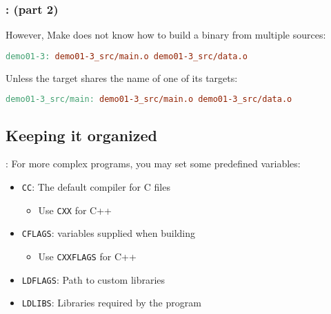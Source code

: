 \begin{frame}[fragile]
    \frametitle{\secname: \small\subsecname (part 2)\normalsize}

    However, Make does not know how to build a binary from multiple sources:

    \begin{lstlisting}[language=make]
demo01-3: demo01-3_src/main.o demo01-3_src/data.o
    \end{lstlisting}

    Unless the target shares the name of one of its targets:
    \begin{lstlisting}[language=make]
demo01-3_src/main: demo01-3_src/main.o demo01-3_src/data.o
    \end{lstlisting}
\end{frame}

%
%
%

\subsection{Keeping it organized}
\begin{frame}{\secname: \small\subsecname\normalsize}
    For more complex programs, you may set some predefined
    variables:

    \begin{itemize}
        \item \texttt{CC}: The default compiler for C files
        \begin{itemize}
            \item Use \texttt{CXX} for C++
        \end{itemize}
        \item \texttt{CFLAGS}: variables supplied when building
        \begin{itemize}
            \item Use \texttt{CXXFLAGS} for C++
        \end{itemize}
        \item \texttt{LDFLAGS}: Path to custom libraries
        \item \texttt{LDLIBS}: Libraries required by the program
    \end{itemize}
\end{frame}
